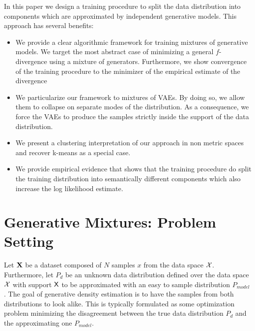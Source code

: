 \documentclass{article}
\newcommand{\Pd}{P_{d}}
\newcommand{\Pm}{P_{model}}
\begin{document}
In this paper we design a training procedure to split the data distribution into components which are approximated by independent generative models. This approach has several benefits:
\begin{itemize}
\item We provide a clear algorithmic framework for training mixtures of generative models. We target the most abstract case of minimizing a general $f$-divergence using a mixture of generators. Furthermore, we show convergence of the training procedure to the minimizer of the empirical estimate of the divergence
\item We particularize our framework to mixtures of VAEs. By doing so, we allow them to collapse on separate modes of the distribution. As a consequence, we force the VAEs to produce the samples strictly inside the support of the data distribution.
\item We present a clustering interpretation of our approach in non metric spaces and recover  k-means as a special case.
\item We provide empirical evidence that shows that the training procedure do split the training distribution into semantically different components which also increase the log likelihood estimate.
\end{itemize}

\section{Generative Mixtures: Problem Setting}
Let ${\mathbf{X}}$ be a dataset composed of $N$ samples $x$ from the data space $\mathcal{X}$. 
Furthermore, let $\Pd$ be an unknown data distribution defined over the data space $\mathcal{X}$ with support $\mathsf{X}$ to be approximated with an easy to sample distribution $\Pm$. The goal of generative density estimation is to have the samples from both distributions to look alike. This is typically formulated as some optimization problem minimizing the disagreement between the true data distribution $\Pd$ and the approximating one $\Pm$.
\end{document}
